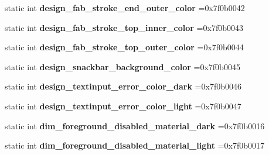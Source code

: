 \begin{DoxyCompactItemize}
static int {\bfseries design\+\_\+fab\+\_\+stroke\+\_\+end\+\_\+outer\+\_\+color} =0x7f0b0042
\item 
\mbox{\label{classandroid_1_1support_1_1v7_1_1recyclerview_1_1R_1_1color_a0b4b63cf64d684f3e3660800ed43a57e}} 
static int {\bfseries design\+\_\+fab\+\_\+stroke\+\_\+top\+\_\+inner\+\_\+color} =0x7f0b0043
\item 
\mbox{\label{classandroid_1_1support_1_1v7_1_1recyclerview_1_1R_1_1color_a357f68d03f1602f497624dff5d891c14}} 
static int {\bfseries design\+\_\+fab\+\_\+stroke\+\_\+top\+\_\+outer\+\_\+color} =0x7f0b0044
\item 
\mbox{\label{classandroid_1_1support_1_1v7_1_1recyclerview_1_1R_1_1color_a3aba2b805165c2f7e4da5998fa6b2c82}} 
static int {\bfseries design\+\_\+snackbar\+\_\+background\+\_\+color} =0x7f0b0045
\item 
\mbox{\label{classandroid_1_1support_1_1v7_1_1recyclerview_1_1R_1_1color_a88499921ca73131c039b4b633eaf4bad}} 
static int {\bfseries design\+\_\+textinput\+\_\+error\+\_\+color\+\_\+dark} =0x7f0b0046
\item 
\mbox{\label{classandroid_1_1support_1_1v7_1_1recyclerview_1_1R_1_1color_ab50bb8a0dca83f1632d6f9a7e2642a6a}} 
static int {\bfseries design\+\_\+textinput\+\_\+error\+\_\+color\+\_\+light} =0x7f0b0047
\item 
\mbox{\label{classandroid_1_1support_1_1v7_1_1recyclerview_1_1R_1_1color_a94e663c8cdcb1ff3339db7eb2849ce2c}} 
static int {\bfseries dim\+\_\+foreground\+\_\+disabled\+\_\+material\+\_\+dark} =0x7f0b0016
\item 
\mbox{\label{classandroid_1_1support_1_1v7_1_1recyclerview_1_1R_1_1color_a9d9975dc90d011058749ad137a5f9fbc}} 
static int {\bfseries dim\+\_\+foreground\+\_\+disabled\+\_\+material\+\_\+light} =0x7f0b0017
\item 

\end{DoxyCompactItemize}
